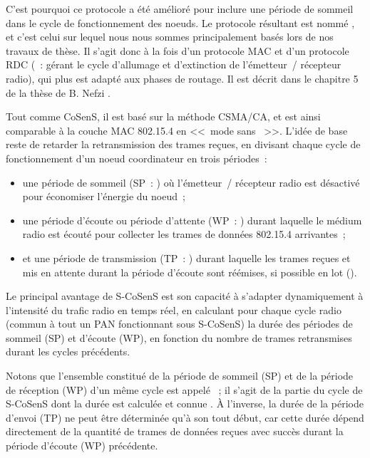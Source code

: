 C'est pourquoi ce protocole a été amélioré pour inclure une période
de sommeil dans le cycle de fonctionnement des noeuds. Le protocole
résultant est nommé , et c'est celui sur lequel nous
nous sommes principalement basés lors de nos travaux de thèse. Il s'agit
donc à la fois d'un protocole MAC et d'un protocole RDC (~: gérant le cycle d'allumage et d'extinction de l'émetteur~/
récepteur radio), qui plus est adapté aux phases de routage. Il est décrit
dans le chapitre 5 de la thèse de B. Nefzi \cite{TheseBNefzi}.

Tout comme CoSenS, il est basé sur la méthode CSMA/CA, et est ainsi
comparable à la couche MAC 802.15.4 en <<~mode sans ~>>.
L'idée de base reste de retarder la retransmission des trames reçues,
en divisant chaque cycle de fonctionnement d'un noeud coordinateur
en trois périodes~:
\begin{itemize}
\item une période de sommeil (SP~: ) où l'émetteur~/
récepteur radio est désactivé pour économiser l'énergie du noeud~;
\item une période d'écoute ou période d'attente (WP~: )
durant laquelle le médium radio est écouté pour collecter les trames de
données 802.15.4 arrivantes~;
\item et une période de transmission (TP~: )
durant laquelle les trames reçues et mis en attente durant la période
d'écoute sont réémises, si possible en lot ().
\end{itemize}

Le principal avantage de S-CoSenS est son capacité à s'adapter dynamiquement
à l'intensité du trafic radio en temps réel, en calculant pour chaque cycle
radio (commun à tout un PAN fonctionnant sous S-CoSenS) la durée des
périodes de sommeil (SP) et d'écoute (WP), en fonction du nombre de
trames retransmises durant les cycles précédents.

Notons que l'ensemble constitué de la période de sommeil (SP) et de la
période de réception (WP) d'un même cycle est appelé ~;
il s'agit de la partie du cycle de S-CoSenS dont la durée est calculée
et connue . À l'inverse, la durée de la période d'envoi (TP)
ne peut être déterminée qu'à son tout début, car cette durée dépend
directement de la quantité de trames de données reçues avec succès
durant la période d'écoute (WP) précédente.

